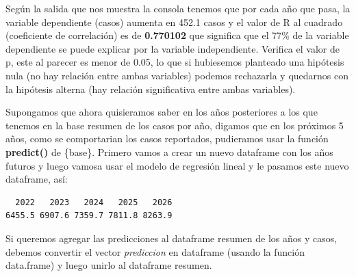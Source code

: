 \documentclass[
  letterpaper,
  DIV=11,
  numbers=noendperiod]{scrreprt}
\newenvironment{Shaded}{\begin{snugshade}}{\end{snugshade}}
\newcommand{\AttributeTok}[1]{\textcolor[rgb]{0.40,0.45,0.13}{#1}}
\newcommand{\CommentTok}[1]{\textcolor[rgb]{0.37,0.37,0.37}{#1}}
\newcommand{\DecValTok}[1]{\textcolor[rgb]{0.68,0.00,0.00}{#1}}
\newcommand{\FunctionTok}[1]{\textcolor[rgb]{0.28,0.35,0.67}{#1}}
\newcommand{\NormalTok}[1]{\textcolor[rgb]{0.00,0.23,0.31}{#1}}
\newcommand{\OtherTok}[1]{\textcolor[rgb]{0.00,0.23,0.31}{#1}}
\newcommand{\SpecialCharTok}[1]{\textcolor[rgb]{0.37,0.37,0.37}{#1}}
\begin{document}
Según la salida que nos muestra la consola tenemos que por cada año que
pasa, la variable dependiente (casos) aumenta en 452.1 casos y el valor
de R al cuadrado (coeficiente de correlación) es de \textbf{0.770102}
que significa que el 77\% de la variable dependiente se puede explicar
por la variable independiente. Verifica el valor de p, este al parecer
es menor de 0.05, lo que si hubiesemos planteado una hipótesis nula (no
hay relación entre ambas variables) podemos rechazarla y quedarnos con
la hipótesis alterna (hay relación significativa entre ambas variables).

Supongamos que ahora quisieramos saber en los años posteriores a los que
tenemos en la base resumen de los casos por año, digamos que en los
próximos 5 años, como se comportarian los casos reportados, pudieramos
usar la función \textbf{predict()} de \{base\}. Primero vamos a crear un
nuevo dataframe con los años futuros y luego vamosa usar el modelo de
regresión lineal y le pasamos este nuevo dataframe, así:

\begin{Shaded}
\end{Shaded}

\begin{verbatim}
  2022   2023   2024   2025   2026 
6455.5 6907.6 7359.7 7811.8 8263.9 
\end{verbatim}

Si queremos agregar las predicciones al dataframe resumen de los años y
casos, debemos convertir el vector \emph{prediccion} en dataframe
(usando la función data.frame) y luego unirlo al dataframe resumen.
\end{document}
